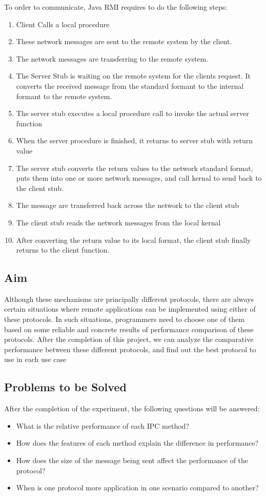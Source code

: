 \documentclass{article}
\begin{document}
To order to communicate, Java RMI requires to do the following steps:
\begin{enumerate}
\item Client Calls a local procedure
\item These network messages are sent to the remote system by the client.
\item The network messages are transferring to the remote system.
\item The Server Stub is waiting on the remote system for the clients request. It converts the received message from the standard formant to the internal formant to the remote system.
\item The server stub executes a local procedure call to invoke the actual server function
\item When the server procedure is finished, it returns to server stub with return value
\item The server stub converts the return values to the network standard format, puts them into one or more network messages, and call kernal to send back to the client stub.
\item The message are transferred back across the network to the client stub
\item The client stub reads the network messages from the local kernal
\item After converting the return value to its local format, the client stub finally returns to the client function.
\end{enumerate}


\subsection{Aim}
Although these mechanisms are principally different protocols, there are always certain situations where remote applications can be implemented using either of these protocols. In such situations, programmers need to choose one of them based on some reliable and concrete results of performance comparison of these protocols. After the completion of this project, we can analyze the comparative performance between these different protocols, and find out the best protocol to use in each use case  \\


\subsection{Problems to be Solved}
After the completion of the experiment, the following questions will be answered:
\begin{itemize}
\item What is the relative performance of each IPC method?
\item How does the features of each method explain the difference in performance?	
\item How does the size of the message being sent affect the performance of the protocol?
\item When is one protocol more application in one scenario compared to another?
\end{itemize}
\end{document}

